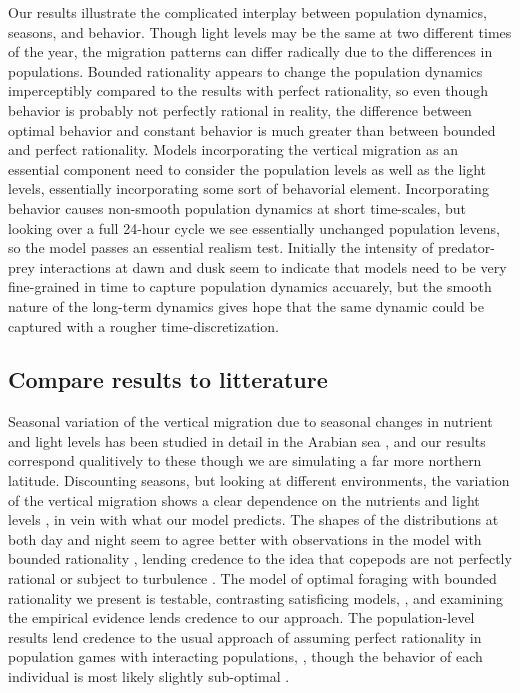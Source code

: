 Our results illustrate the complicated interplay between population dynamics, seasons, and behavior. Though light levels may be the same at two different times of the year, the migration patterns can differ radically due to the differences in populations. Bounded rationality appears to change the population dynamics imperceptibly compared to the results with perfect rationality, so even though behavior is probably not perfectly rational in reality, the difference between optimal behavior and constant behavior is much greater than between bounded and perfect rationality. Models incorporating the vertical migration as an essential component need to consider the population levels as well as the light levels, essentially incorporating some sort of behavorial element. Incorporating behavior causes non-smooth population dynamics at short time-scales, but looking over a full 24-hour cycle we see essentially unchanged population levens, so the model passes an essential realism test. Initially the intensity of predator-prey interactions at dawn and dusk seem to indicate that models need to be very fine-grained in time to capture population dynamics accuarely, but the smooth nature of the long-term dynamics gives hope that the same dynamic could be captured with a rougher time-discretization.


\subsection{Compare results to litterature} %
Seasonal variation of the vertical migration due to seasonal changes in nutrient and light levels has been studied in detail in the Arabian sea \citep{wang2014seasonal}, and our results correspond qualitively to these though we are simulating a far more northern latitude. Discounting seasons, but looking at different environments, the variation of the vertical migration shows a clear dependence on the nutrients and light levels \citep{klevjer2016large}, in vein with what our model predicts. The shapes of the distributions at both day and night seem to agree better with observations in the model with bounded rationality \citep{hay1991zooplankton}, lending credence to the idea that copepods are not perfectly rational or subject to turbulence \citep{visser2001observations}. The model of optimal foraging with bounded rationality we present is testable, contrasting satisficing models,
\citep{nonacs1993satisficing}, and examining the empirical evidence lends credence to our approach. The population-level results lend credence to the usual approach of assuming perfect
rationality in population games with interacting populations, \citep{kvrivan2008ideal}, though the behavior of each individual is most likely slightly sub-optimal
\citep{hurly1999context}.

